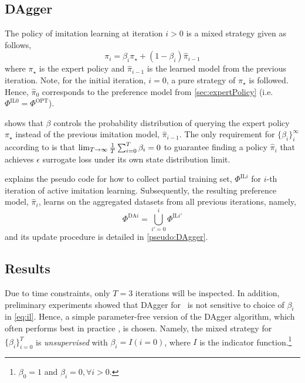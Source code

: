\documentclass[smallextended]{svjour3}
\begin{document}
\subsection{DAgger}
The policy of imitation learning at iteration $i>0$ is a mixed strategy given 
as follows, 
\begin{equation}\label{eq:il}
\pi_i = \beta_i\pi_\star + (1-\beta_i)\hat{\pi}_{i-1}
\end{equation}
where $\pi_\star$ is the expert policy and $\hat{\pi}_{i-1}$ is the learned 
model from the previous iteration. 
Note, for the initial iteration, $i=0$, a pure strategy of $\pi_\star$ is 
followed. Hence, $\hat{\pi}_0$ corresponds to the preference model from 
\cref{sec:expertPolicy} (i.e. $\Phi^{\text{IL}0}=\Phi^{\text{OPT}}$). 

 shows that $\beta$ controls the probability distribution of 
querying the expert policy $\pi_\star$ instead of the previous imitation model, 
$\hat{\pi}_{i-1}$.  
The only requirement for $\{\beta_i\}_i^\infty$ according to \cite{RossGB11} is 
that $\limit{\frac{1}{T}\sum_{i=0}^T\beta_i}{T\to\infty}{0}$ to guarantee 
finding a policy $\hat{\pi}_i$ that achieves $\epsilon$ surrogate loss under 
its own state distribution limit.

 explains the pseudo code for how to collect 
partial training set, $\Phi^{\text{IL}i}$ for $i$-th iteration of active 
imitation learning.
Subsequently, the resulting preference model, $\hat{\pi}_i$, learns on the 
aggregated datasets from all previous iterations, namely,  
\begin{equation}\label{eq:DAgger}
\Phi^{\text{DA}i}=\bigcup_{i'=0}^{i}\Phi^{\text{IL}i'}
\end{equation}
and its update procedure is detailed in \cref{pseudo:DAgger}.




\subsection{Results}\label{sec:ail:expr}
Due to time constraints, only $T=3$ iterations will be inspected.
In addition, preliminary experiments showed that DAgger for \jsp\ is not 
sensitive to choice of $\beta_i$ in \cref{eq:il}. 
Hence, a simple parameter-free version of the DAgger algorithm, which often 
performs best in practice \cite{RossGB11}, is chosen. 
Namely, the mixed strategy for $\{\beta_i\}_{i=0}^T$ is \emph{unsupervised} 
with $\beta_i=I(i=0)$, where $I$ is the indicator 
function.\footnote{$\beta_0=1$ and $\beta_i=0,\forall i>0$.}
\end{document}
